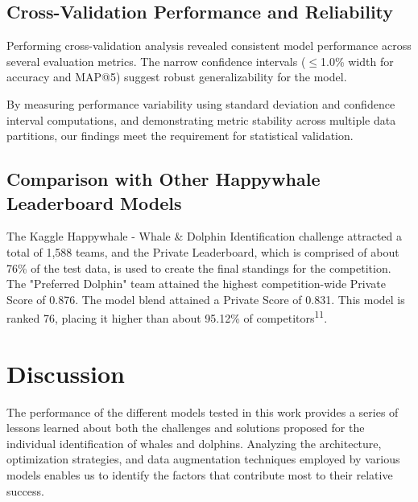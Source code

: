 \documentclass[twocolumn]{article}
\begin{document}
\subsection{Cross-Validation Performance and Reliability}

Performing cross-validation analysis revealed consistent model performance across several evaluation metrics. The narrow confidence intervals (\(\leq\)1.0\% width for accuracy and MAP@5) suggest robust generalizability for the model.

\begin{table}
  \centering
\end{table}

By measuring performance variability using standard deviation and confidence interval computations, and demonstrating metric stability across multiple data partitions, our findings meet the requirement for statistical validation.

\subsection{Comparison with Other Happywhale Leaderboard Models}

The Kaggle Happywhale - Whale \& Dolphin Identification challenge attracted a total of 1,588 teams, and the Private Leaderboard, which is comprised of about 76\% of the test data, is used to create the final standings for the competition. The "Preferred Dolphin" team attained the highest competition-wide Private Score of 0.876. The model blend attained a Private Score of 0.831. This model is ranked 76, placing it higher than about 95.12\% of competitors\textsuperscript{11}.

\section{Discussion}

The performance of the different models tested in this work provides a series of lessons learned about both the challenges and solutions proposed for the individual identification of whales and dolphins. Analyzing the architecture, optimization strategies, and data augmentation techniques employed by various models enables us to identify the factors that contribute most to their relative success.
\end{document}
